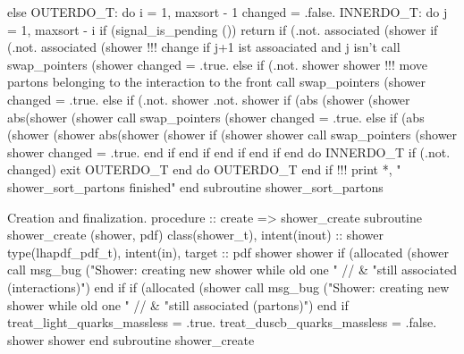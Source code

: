     else
       OUTERDO_T: do i = 1, maxsort - 1
          changed = .false.
          INNERDO_T: do j = 1, maxsort - i
             if (signal_is_pending ()) return
             if (.not. associated (shower%
             if (.not. associated (shower%
                !!! change if j+1 ist assoaciated and j isn't
                call swap_pointers (shower%
                changed = .true.
             else if (.not. shower%
                  shower%
                !!! move partons belonging to the interaction to the front
                call swap_pointers (shower%
                changed = .true.
             else if (.not. shower%
                  .not. shower%
                if (abs (shower%
                     (shower%
                     abs(shower%
                     (shower%
                   call swap_pointers (shower%
                   changed = .true.
                else
                   if (abs (shower%
                        (shower%
                        abs(shower%
                        (shower%
                      if (shower%
                           shower%
                         call swap_pointers (shower%
                              shower%
                         changed = .true.
                      end if
                   end if
                end if
             end if
          end do INNERDO_T
          if (.not. changed) exit OUTERDO_T
       end do OUTERDO_T
    end if
    !!! print *, "  shower_sort_partons finished"
  end subroutine shower_sort_partons

\eatline
\nwendcode{}Creation and finalization.
\nwenddocs{}\plusendmoddef
  procedure :: create => shower_create
\nwendcode{}\plusendmoddef
  subroutine shower_create (shower, pdf)
    class(shower_t), intent(inout) :: shower
    type(lhapdf_pdf_t), intent(in), target :: pdf
    shower%
    shower%
    if (allocated (shower%
       call msg_bug ("Shower: creating new shower while old one " // &
            "still associated (interactions)")
    end if
    if (allocated (shower%
       call msg_bug ("Shower: creating new shower while old one " // &
            "still associated (partons)")
    end if
    treat_light_quarks_massless = .true.
    treat_duscb_quarks_massless = .false.
    shower%
    shower%
  end subroutine shower_create

